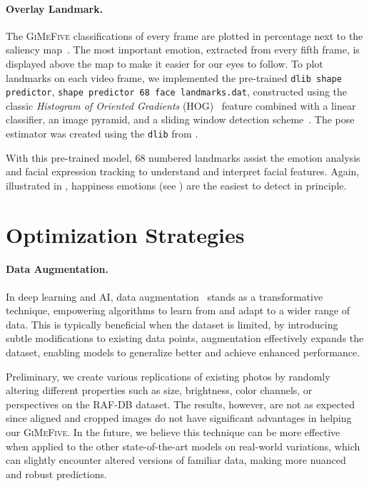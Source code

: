 \paragraph{Overlay Landmark.}
The \textsc{GiMeFive} classifications of every frame are plotted in percentage next to the saliency map~\cite{SimonyanVZ13}.
The most important emotion, extracted from every fifth frame, 
is displayed above the map to make it easier for our eyes to follow. 
To plot landmarks on each video frame, 
we implemented the pre-trained \texttt{dlib shape predictor}, \texttt{shape predictor 68 face landmarks.dat}, 
constructed using the classic \textit{Histogram of Oriented Gradients} (HOG)~\cite{1467360} feature combined with a linear classifier, 
an image pyramid, and a sliding window detection scheme~\cite{dlib_site}. 
The pose estimator was created using the \texttt{dlib} from \citet{6909637}.

With this pre-trained model, 
68 numbered landmarks assist the emotion analysis and facial expression tracking to understand and interpret facial features.
Again, illustrated in , 
happiness emotions (see ) are the easiest to detect in principle. 

\section{Optimization Strategies}
\label{sec:optim}

\paragraph{Data Augmentation.}
In deep learning and AI, 
data augmentation~\cite{augment} stands as a transformative technique, 
empowering algorithms to learn from and adapt to a wider range of data. 
This is typically beneficial when the dataset is limited, 
by introducing subtle modifications to existing data points, 
augmentation effectively expands the dataset, 
enabling models to generalize better and achieve enhanced performance. 

Preliminary, 
we create various replications of existing photos by randomly altering different properties such as size, 
brightness, color channels, or perspectives on the RAF-DB dataset. 
The results, however, are not as expected since aligned and cropped images do not have significant advantages in helping our \textsc{GiMeFive}. 
In the future, 
we believe this technique can be more effective when applied to the other state-of-the-art models on real-world variations, 
which can slightly encounter altered versions of familiar data, 
making more nuanced and robust predictions. 

